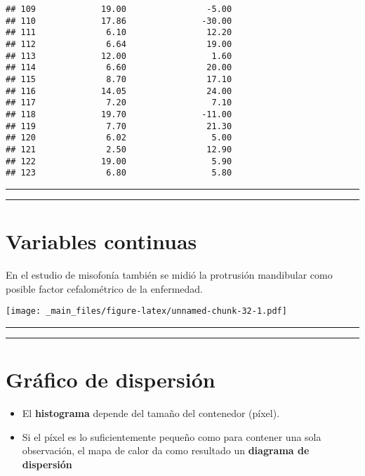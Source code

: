 \documentclass[
]{book}
\begin{document}
\begin{verbatim}
## 109             19.00                -5.00
## 110             17.86               -30.00
## 111              6.10                12.20
## 112              6.64                19.00
## 113             12.00                 1.60
## 114              6.60                20.00
## 115              8.70                17.10
## 116             14.05                24.00
## 117              7.20                 7.10
## 118             19.70               -11.00
## 119              7.70                21.30
## 120              6.02                 5.00
## 121              2.50                12.90
## 122             19.00                 5.90
## 123              6.80                 5.80
\end{verbatim}

\begin{center}\rule{0.5\linewidth}{0.5pt}\end{center}

\begin{center}\rule{0.5\linewidth}{0.5pt}\end{center}

\hypertarget{variables-continuas-2}{%
\section{Variables continuas}\label{variables-continuas-2}}

En el estudio de misofonía también se midió la protrusión mandibular como posible factor cefalométrico de la enfermedad.

\texttt{[image: \_main\_files/figure-latex/unnamed-chunk-32-1.pdf]}

\begin{center}\rule{0.5\linewidth}{0.5pt}\end{center}

\begin{center}\rule{0.5\linewidth}{0.5pt}\end{center}

\hypertarget{gruxe1fico-de-dispersiuxf3n}{%
\section{Gráfico de dispersión}\label{gruxe1fico-de-dispersiuxf3n}}

\begin{itemize}
\item
  El \textbf{histograma} depende del tamaño del contenedor (píxel).
\item
  Si el píxel es lo suficientemente pequeño como para contener una sola observación, el mapa de calor da como resultado un \textbf{diagrama de dispersión}
\end{itemize}
\end{document}
